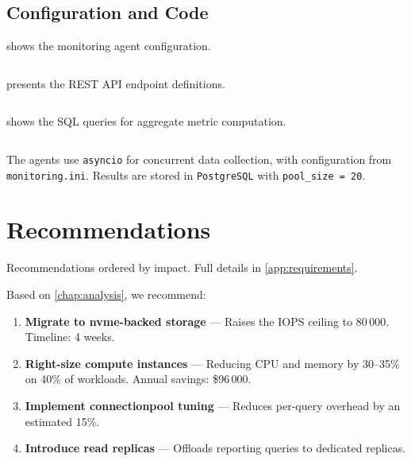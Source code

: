 \documentclass[
    language=english,
    doctype=technical-report,
    institution=none,
    titlestyle=book,
    oneside,
    loadGlossaries,
]{../../omnilatex}
\begin{document}
\section{Configuration and Code}

 shows the monitoring agent configuration.

\begin{listing}[htbp]
    \centering
    \inputminted[fontsize=\scriptsize, linenos, frame=lines, framesep=2mm]
        {ini}{config/monitoring.ini}
    \caption{Monitoring agent configuration file.}
    \label{code:config}
\end{listing}

 presents the REST API endpoint definitions.

\begin{listing}[htbp]
    \centering
    \inputminted[fontsize=\scriptsize, linenos, frame=lines, framesep=2mm]
        {http}{config/api-routes.http}
    \caption{Metrics API endpoint definitions.}
    \label{code:api}
\end{listing}

 shows the SQL queries for aggregate metric computation.

\begin{listing}[htbp]
    \centering
    \inputminted[fontsize=\scriptsize, linenos, frame=lines, framesep=2mm]
        {sql}{config/queries.sql}
    \caption{Aggregate metric computation queries.}
    \label{code:sql}
\end{listing}

The agents use \texttt{asyncio} for concurrent data
collection, with configuration from \texttt{monitoring.ini}.
Results are stored in \texttt{PostgreSQL} with
\texttt{pool_size = 20}.

\chapter{Recommendations}
\label{sec:recommendations}

\begin{notebox}
Recommendations ordered by impact. Full details in \cref{app:requirements}.
\end{notebox}

Based on \cref{chap:analysis}, we recommend:
\begin{enumerate}
    \item \textbf{Migrate to \gls{nvme}-backed storage} --- Raises the
        IOPS ceiling to 80\,000. Timeline: 4 weeks.
    \item \textbf{Right-size compute instances} --- Reducing CPU and
        memory by 30--35\% on 40\% of workloads. Annual savings: \$96\,000.
    \item \textbf{Implement \gls{connectionpool} tuning} --- Reduces
        per-query overhead by an estimated 15\%.
    \item \textbf{Introduce read replicas} --- Offloads reporting queries
        to dedicated replicas.
\end{enumerate}
\end{document}
